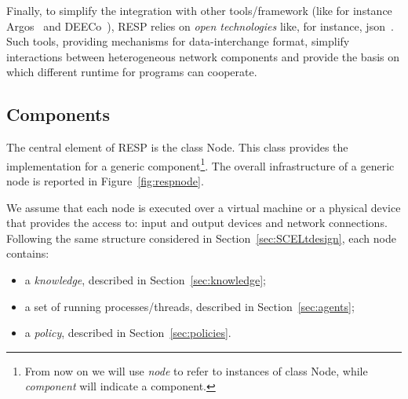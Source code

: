 \documentclass[11pt]{article}
\newcommand{\resp}{\textsf{RESP}}
\begin{document}
Finally, to simplify the integration with other tools/framework (like for instance Argos~\cite{??} and DEECo~\cite{??}), \resp{} relies on
 \emph{open technologies} like, for instance, \textsf{json}~\cite{JSON}. Such tools, providing mechanisms for data-interchange format,
simplify interactions between heterogeneous network components and provide the basis on which different runtime for 
 \SCEL{} programs can cooperate.
 
%

\subsection{Components}
\label{sec:components}

The central element of \resp{} is the class \textsf{Node}. This class provides the implementation for a generic \SCEL{} component\footnote{From now on we will
use \emph{node} to refer to instances of class \textsf{Node}, while \emph{component} will indicate a \SCEL{} component.}.
%
The overall infrastructure of a generic node is reported in Figure~\ref{fig:respnode}. 

We assume that each node is executed over a virtual machine or a physical device that provides the access to: input and output devices
and network connections. 
%
Following the same structure considered in Section~\ref{sec:SCELtdesign}, each node contains:
\begin{itemize}
\item a \emph{knowledge}, described in Section~\ref{sec:knowledge};
\item a set of running processes/threads, described in Section~\ref{sec:agents};
\item a \emph{policy}, described in Section~\ref{sec:policies}.
\end{itemize}
\end{document}
